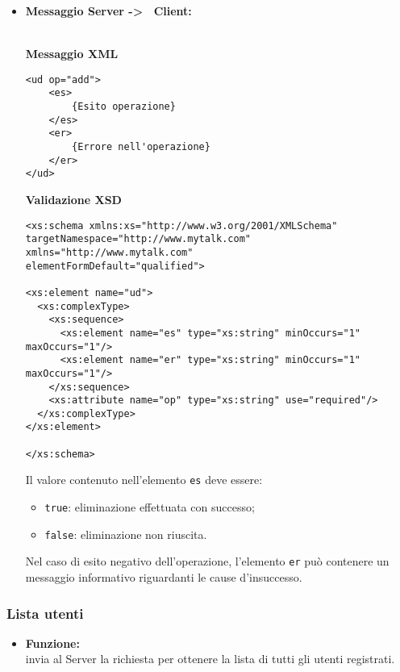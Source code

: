 {{\begin{itemize}
{\begin{lstlisting}
<xs:simpleType name="emailAddress"> 
    <xs:restriction base="xs:string"> 
      <xs:pattern value="[^@]+@[^\.]+\..+"/> 
    </xs:restriction> 
</xs:simpleType> 

</xs:schema>
				\end{lstlisting}
				}
				
				\item[] \textbf{Messaggio Server -\textgreater~ Client:}{\\
				\textbf{Messaggio XML}\\
				\begin{lstlisting}
<ud op="add">
	<es>
		{Esito operazione}
	</es>
	<er>
		{Errore nell'operazione}
	</er>
</ud>
				\end{lstlisting}
				\textbf{Validazione XSD}\\
				\begin{lstlisting}
<xs:schema xmlns:xs="http://www.w3.org/2001/XMLSchema"
targetNamespace="http://www.mytalk.com"
xmlns="http://www.mytalk.com"
elementFormDefault="qualified">

<xs:element name="ud">
  <xs:complexType>
    <xs:sequence>
      <xs:element name="es" type="xs:string" minOccurs="1" maxOccurs="1"/>
      <xs:element name="er" type="xs:string" minOccurs="1" maxOccurs="1"/>
    </xs:sequence>
    <xs:attribute name="op" type="xs:string" use="required"/>
  </xs:complexType>
</xs:element>

</xs:schema>
				\end{lstlisting}
				Il valore contenuto nell'elemento \texttt{es} deve essere:
				\begin{itemize}
					\item \texttt{true}: eliminazione effettuata con successo;
					\item \texttt{false}: eliminazione non riuscita.
				\end{itemize}
				Nel caso di esito negativo dell'operazione, l'elemento \texttt{er} può contenere un messaggio informativo riguardanti le cause d'insuccesso.
				}
		\end{itemize}
	}%
	
	
	\subsubsection{Lista utenti}{
	\label{opCUList}
		\begin{itemize}
			\item[] \textbf{Funzione:}{\\
				invia al Server la richiesta per ottenere la lista di tutti gli utenti registrati.
				}
			

\end{itemize}}}
